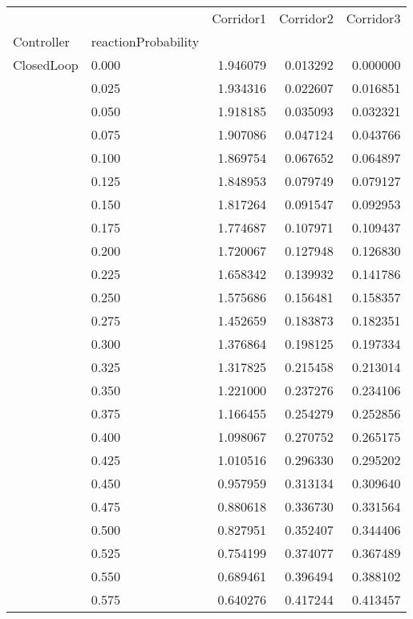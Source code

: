 \begin{tabular}{llrrr}
\toprule
         &       &  Corridor1 &  Corridor2 &  Corridor3 \\
Controller & reactionProbability &            &            &            \\
\midrule
ClosedLoop & 0.000 &   1.946079 &   0.013292 &   0.000000 \\
         & 0.025 &   1.934316 &   0.022607 &   0.016851 \\
         & 0.050 &   1.918185 &   0.035093 &   0.032321 \\
         & 0.075 &   1.907086 &   0.047124 &   0.043766 \\
         & 0.100 &   1.869754 &   0.067652 &   0.064897 \\
         & 0.125 &   1.848953 &   0.079749 &   0.079127 \\
         & 0.150 &   1.817264 &   0.091547 &   0.092953 \\
         & 0.175 &   1.774687 &   0.107971 &   0.109437 \\
         & 0.200 &   1.720067 &   0.127948 &   0.126830 \\
         & 0.225 &   1.658342 &   0.139932 &   0.141786 \\
         & 0.250 &   1.575686 &   0.156481 &   0.158357 \\
         & 0.275 &   1.452659 &   0.183873 &   0.182351 \\
         & 0.300 &   1.376864 &   0.198125 &   0.197334 \\
         & 0.325 &   1.317825 &   0.215458 &   0.213014 \\
         & 0.350 &   1.221000 &   0.237276 &   0.234106 \\
         & 0.375 &   1.166455 &   0.254279 &   0.252856 \\
         & 0.400 &   1.098067 &   0.270752 &   0.265175 \\
         & 0.425 &   1.010516 &   0.296330 &   0.295202 \\
         & 0.450 &   0.957959 &   0.313134 &   0.309640 \\
         & 0.475 &   0.880618 &   0.336730 &   0.331564 \\
         & 0.500 &   0.827951 &   0.352407 &   0.344406 \\
         & 0.525 &   0.754199 &   0.374077 &   0.367489 \\
         & 0.550 &   0.689461 &   0.396494 &   0.388102 \\
         & 0.575 &   0.640276 &   0.417244 &   0.413457 \\

\end{tabular}
